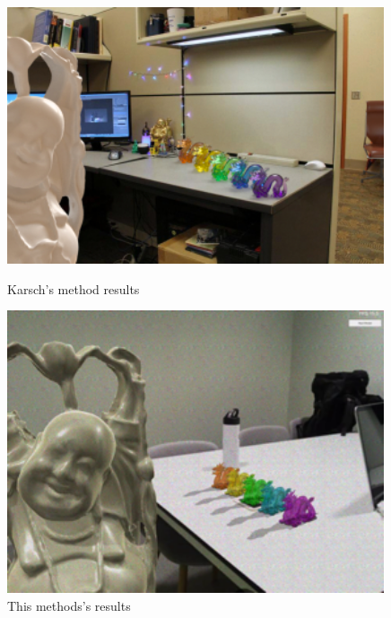 \begin{figure}[H]
    \centering
    \begin{minipage}{0.475\textwidth}
        \centering
        \includegraphics[width=0.99\textwidth]{Figures/budaDragonKarsch.png} %
        \caption{Karsch's method results}
    \end{minipage}\hfill
    \begin{minipage}{0.475\textwidth}
        \centering
        \includegraphics[width=0.99\textwidth]{Figures/budaDragon.png} %
        \caption{This methods's results}
    \end{minipage}
\end{figure}


